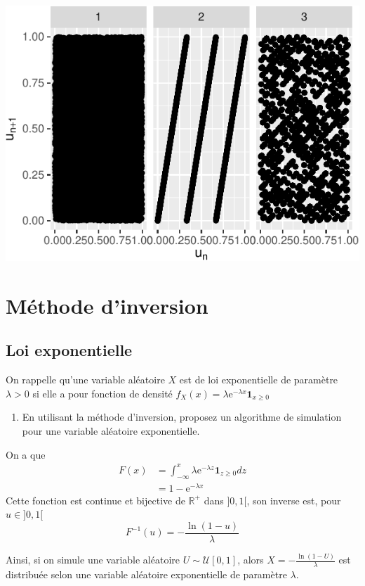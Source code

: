 \documentclass[]{article}
\providecommand{\tightlist}{%
  \setlength{\itemsep}{0pt}\setlength{\parskip}{0pt}}
\newenvironment{Correction}%
  { \vspace{\baselineskip}\begin{mdframed}[backgroundcolor=my_green]}%
  {\end{mdframed}}
\begin{document}
\begin{center}\includegraphics{correction_simulation_variables_aleatoires_files/figure-latex/plots_autocorrelation-1} \end{center}

\hypertarget{muxe9thode-dinversion}{%
\section{Méthode d'inversion}\label{muxe9thode-dinversion}}

\hypertarget{loi-exponentielle}{%
\subsection{Loi exponentielle}\label{loi-exponentielle}}

On rappelle qu'une variable aléatoire \(X\) est de loi exponentielle de
paramètre \(\lambda > 0\) si elle a pour fonction de densité
\(f_X(x) = \lambda\text{e}^{-\lambda x} \mathbf{1}_{x\geq0}\)

\begin{enumerate}
\def\labelenumi{\arabic{enumi}.}
\tightlist
\item
  En utilisant la méthode d'inversion, proposez un algorithme de
  simulation pour une variable aléatoire exponentielle.
\end{enumerate}

\begin{Correction}

On a que
\begin{align*}
F(x) &= \int_\mathbb{-\infty}^x \lambda\text{e}^{-\lambda z} \mathbf{1}_{z\geq0} dz\\
&= 1 - \text{e}^{-\lambda x}
\end{align*}
Cette fonction est continue et bijective de $\mathbb{R^+}$ dans $]0,1[$, son inverse est, pour $u\in ]0, 1[$
$$F^{-1}(u) = -\frac{\ln (1 - u)}{\lambda}$$

Ainsi, si on simule une variable aléatoire $U\sim \mathcal{U}[0, 1]$, alors
$X = -\frac{\ln (1 - U)}{\lambda}$ est distribuée selon une variable aléatoire exponentielle de
paramètre $\lambda$.

\end{Correction}
\end{document}
